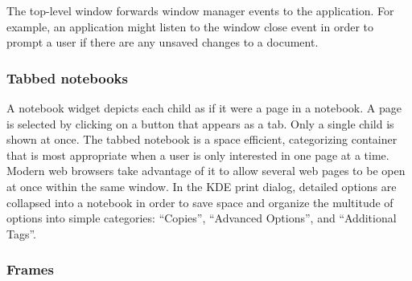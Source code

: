 The top-level window forwards window manager events to the
application. For example, an application might listen to the window
close event in order to prompt a user if there are any unsaved changes
to a document.


\subsubsection{Tabbed notebooks}
\label{sec:GUI:notebooks}

A notebook widget depicts each child as if it were a page in a 
notebook. A
page is selected by clicking on a button that appears as a tab. Only a
single child is shown at once. The tabbed notebook is a space
efficient, categorizing container that is most appropriate when a user
is only interested in one page at a time. Modern web browsers take
advantage of it to allow several web pages to be open at once within
the same window. In the KDE print dialog, detailed options are
collapsed into a notebook in order to save space and organize the
multitude of options into simple categories: ``Copies'', ``Advanced
Options'', and ``Additional Tags''.


\subsubsection{Frames}
\label{sec:GUI:frames}


